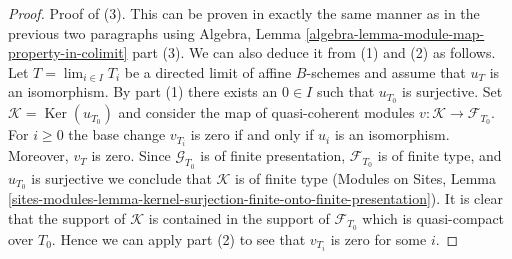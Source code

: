 \documentclass[10pt,a4paper]{amsart}
\theoremstyle{plain}
\theoremstyle{definition}
\theoremstyle{remark}
\numberwithin{equation}{subsection}
\def\lim{\mathop{\mathrm{lim}}\nolimits}
\def\Ker{\mathop{\mathrm{Ker}}}
\begin{document}
\begin{proof}
\medskip\noindent
Proof of (3). This can be proven in exactly the same manner as in the
previous two paragraphs using
Algebra, Lemma \ref{algebra-lemma-module-map-property-in-colimit} part (3).
We can also deduce it from (1) and (2) as follows.
Let $T = \lim_{i \in I} T_i$ be a directed limit of affine $B$-schemes
and assume that $u_T$ is an isomorphism. By part (1) there exists
an $0 \in I$ such that $u_{T_0}$ is surjective. Set
$\mathcal{K} = \Ker(u_{T_0})$ and consider the map of quasi-coherent
modules $v : \mathcal{K} \to \mathcal{F}_{T_0}$. For $i \geq 0$ the base
change $v_{T_i}$ is zero if and only if $u_i$ is an isomorphism. Moreover,
$v_T$ is zero. Since $\mathcal{G}_{T_0}$
is of finite presentation, $\mathcal{F}_{T_0}$ is of finite type, and
$u_{T_0}$ is surjective we conclude that $\mathcal{K}$ is of finite type
(Modules on Sites, Lemma
\ref{sites-modules-lemma-kernel-surjection-finite-onto-finite-presentation}).
It is clear that the support of $\mathcal{K}$ is contained in the
support of $\mathcal{F}_{T_0}$ which is quasi-compact over $T_0$.
Hence we can apply part (2) to see that $v_{T_i}$ is zero for some $i$.
\end{proof}
\end{document}
